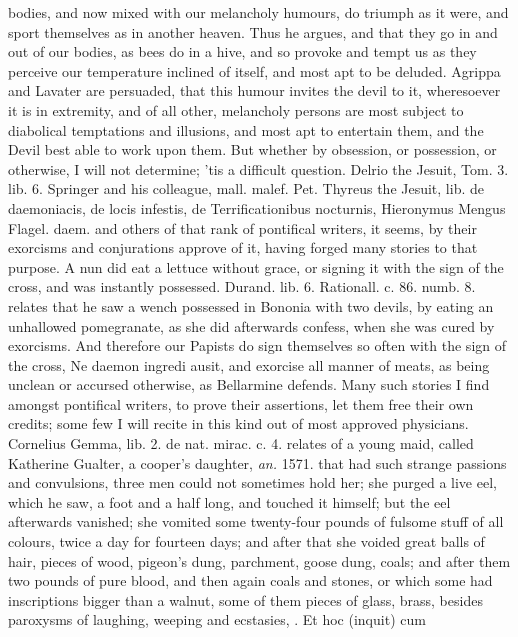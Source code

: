 {bodies, and now mixed with our melancholy humours, do triumph as it
were, and sport themselves as in another heaven. Thus he argues, and
that they go in and out of our bodies, as bees do in a hive, and so
provoke and tempt us as they perceive our temperature inclined of
itself, and most apt to be deluded.  Agrippa and Lavater
are persuaded, that this humour invites the devil to it, wheresoever it
is in extremity, and of all other, melancholy persons are most subject
to diabolical temptations and illusions, and most apt to entertain
them, and the Devil best able to work upon them. But whether by
obsession, or possession, or otherwise, I will not determine; 'tis a
difficult question. Delrio the Jesuit, Tom. 3. lib. 6. Springer and his
colleague, mall. malef. Pet. Thyreus the Jesuit, lib. de daemoniacis,
de locis infestis, de Terrificationibus nocturnis, Hieronymus Mengus
Flagel. daem. and others of that rank of pontifical writers, it seems,
by their exorcisms and conjurations approve of it, having forged many
stories to that purpose. A nun did eat a lettuce without grace,
or signing it with the sign of the cross, and was instantly possessed.
Durand. lib. 6. Rationall. c. 86. numb. 8. relates that he saw a wench
possessed in Bononia with two devils, by eating an unhallowed
pomegranate, as she did afterwards confess, when she was cured by
exorcisms. And therefore our Papists do sign themselves so often with
the sign of the cross, Ne daemon ingredi ausit, and exorcise all manner
of meats, as being unclean or accursed otherwise, as Bellarmine
defends. Many such stories I find amongst pontifical writers, to prove
their assertions, let them free their own credits; some few I will
recite in this kind out of most approved physicians. Cornelius Gemma,
lib. 2. de nat. mirac. c. 4. relates of a young maid, called Katherine
Gualter, a cooper's daughter, \emph{an.} 1571. that had such strange
passions and convulsions, three men could not sometimes hold her; she
purged a live eel, which he saw, a foot and a half long, and touched it
himself; but the eel afterwards vanished; she vomited some twenty-four
pounds of fulsome stuff of all colours, twice a day for fourteen days;
and after that she voided great balls of hair, pieces of wood, pigeon's
dung, parchment, goose dung, coals; and after them two pounds of pure
blood, and then again coals and stones, or which some had inscriptions
bigger than a walnut, some of them pieces of glass, brass, \etc{} besides
paroxysms of laughing, weeping and ecstasies, \etc{}. Et hoc (inquit) cum
}
